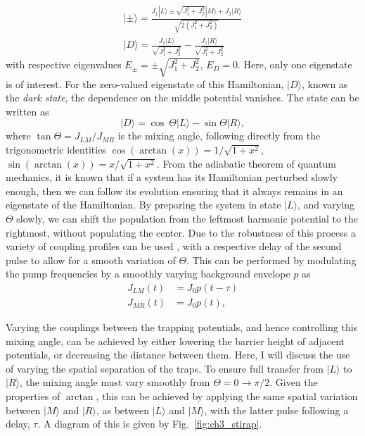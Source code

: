 \begin{subequations}
\begin{align}
| \pm \rangle = \frac{J_1 |L\rangle \pm \sqrt{J_1^2 + J_2^2}|M\rangle + J_2 |R\rangle  }{\sqrt{2(J_1^2 + J_2^2)}} \\
| D \rangle = \frac{J_2 |L\rangle }{\sqrt{J_1^2 + J_2^2}} - \frac{J_1 |R\rangle}{\sqrt{J_1^2 + J_2^2}}
\end{align}
\end{subequations}
with respective eigenvalues $E_{\pm} = \pm {\sqrt{J_1^2 + J_2^2}}$, $E_D = 0$.
Here, only one eigenstate is of interest. For the zero-valued eigenstate of this Hamiltonian, $|D \rangle$, known as the \textit{dark state}, the dependence on the middle potential vanishes. The state can be written as
\begin{equation}
 | D \rangle = \cos\ \Theta| L \rangle - \sin \Theta | R \rangle,
\end{equation}
where $\tan \Theta=J_{LM}/J_{MR}$ is the mixing angle, following directly from the trigonometric identities $\cos (\arctan (x)) = 1/\sqrt{1+x^2}$, $\sin (\arctan (x)) = x/\sqrt{1+x^2}$. From the adiabatic theorem of quantum mechanics, it is known that if a system has its Hamiltonian perturbed slowly enough, then we can follow its evolution ensuring that it always remains in an eigenstate of the Hamiltonian. By preparing the system in state $| L \rangle$, and varying $\Theta$ slowly, we can shift the population from the leftmost harmonic potential to the rightmost, without populating the center. Due to the robustness of this process a variety of coupling profiles can be used \cite{AO:Bergmann_jcp_2015}, with a respective delay of the second pulse to allow for a smooth variation of $\Theta$. This can be performed by modulating the pump frequencies by a smoothly varying background envelope $p$ as \cite{AO:Fewell_ausjp_1997}
\begin{subequations}
\begin{align}
    J_{LM}(t) &= J_0 p(t-\tau) \\
    J_{MR}(t) &= J_0 p(t),
\end{align}
\end{subequations}

Varying the couplings between the trapping potentials, and hence controlling this mixing angle, can be achieved by either lowering the barrier height of adjacent potentials, or decreasing the distance between them. Here, I will discuss the use of varying the spatial separation of the traps. To ensure full transfer from $|L \rangle$ to $| R \rangle$, the mixing angle must vary smoothly from $\Theta = 0 \rightarrow \pi/2$. Given the properties of $\arctan$, this can be achieved by applying the same spatial variation between $|M \rangle$ and $| R\rangle$, as between $|L \rangle$ and $| M\rangle$, with the latter pulse following a delay, $\tau$. A diagram of this is given by Fig.~\ref{fig:ch3_stirap}.


